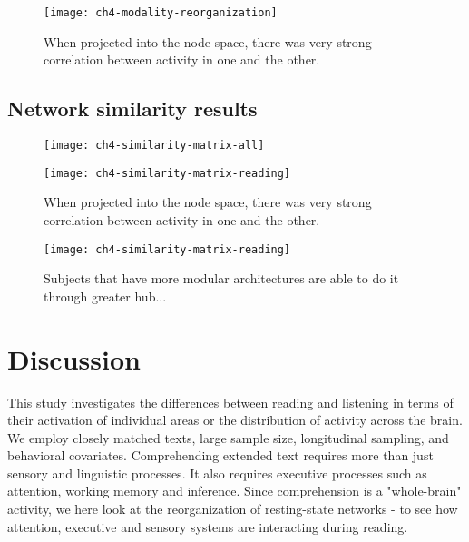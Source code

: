 \begin{figure}[t]
	\centering
	\texttt{[image: ch4-modality-reorganization]}
    \caption[Large overlap between listening and reading activation in the connectome space.]{When projected into the node space, there was very strong correlation between activity in one and the other.}
	\label{fig:ch4-modality-reorganization}
\end{figure}

\subsection{Network similarity results}



\begin{figure}[t]
	\centering
	\texttt{[image: ch4-similarity-matrix-all]}
    \caption[Auditory network organization is more similar for all subjects than it is for reading.]{}
	\label{fig:ch4-modality-network-similarity}
\end{figure}


\begin{figure}[t]
	\centering
	\texttt{[image: ch4-similarity-matrix-reading]}
    \caption[Network similarity between listening and reading predicts word efficiency.]{When projected into the node space, there was very strong correlation between activity in one and the other.}
	\label{fig:ch4-modality-network-similarity}
\end{figure}


\begin{figure}[t]
	\centering
	\texttt{[image: ch4-similarity-matrix-reading]}
    \caption[Diversity of between-network connections predominates on .... ]{Subjects that have more modular architectures are able to do it through greater hub... }
	\label{fig:ch4-modality-network-similarity}
\end{figure}




\section{Discussion}

This study investigates the differences between reading and listening in terms of their activation of individual areas or the distribution of activity across the brain. We employ closely matched texts, large sample size, longitudinal sampling, and behavioral covariates. Comprehending extended text requires more than just sensory and linguistic processes. It also requires executive processes such as attention, working memory and inference. Since comprehension is a "whole-brain" activity, we here look at the reorganization of resting-state networks - to see how attention, executive and sensory systems are interacting during reading.

